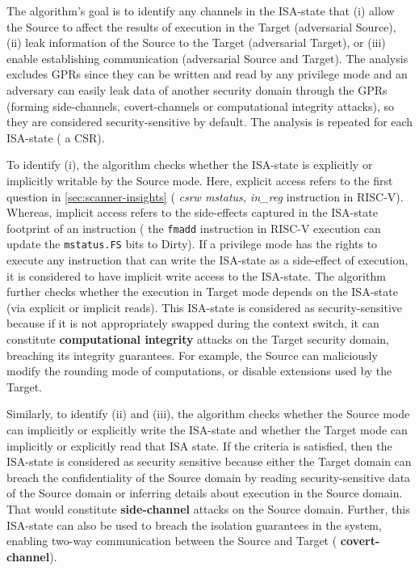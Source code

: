 The algorithm's goal is to identify any channels in the ISA-state that (i) allow the Source to affect the results of execution in the Target (adversarial Source), (ii) leak information of the Source to the Target (adversarial Target), or (iii) enable establishing communication (adversarial Source and Target). 
The analysis excludes GPRs since they can be written and read by any privilege mode and an adversary can easily leak data of another security domain through the GPRs (forming side-channels, covert-channels or computational integrity attacks), so they are considered security-sensitive by default. 
The analysis is repeated for each ISA-state (\eg{} a CSR). 

To identify (i), the algorithm checks whether the ISA-state is explicitly or implicitly writable by the Source mode. 
Here, explicit access refers to the first question in \autoref{sec:scanner-insights} (\eg{} \textit{csrw mstatus, in\_reg} instruction in RISC-V). 
Whereas, implicit access refers to the side-effects captured in the ISA-state footprint of an instruction (\eg{} the \texttt{fmadd} instruction in RISC-V execution can update the \texttt{mstatus.FS} bits to Dirty). 
If a privilege mode has the rights to execute any instruction that can write the ISA-state as a side-effect of execution, it is considered to have implicit write access to the ISA-state. 
The algorithm further checks whether the execution in Target mode depends on the ISA-state (via explicit or implicit reads). 
This ISA-state is considered as security-sensitive because if it is not appropriately swapped during the context switch, it can constitute \textbf{computational integrity} attacks on the Target security domain, breaching its integrity guarantees. 
For example, the Source can maliciously modify the rounding mode of computations, or disable extensions used by the Target.

Similarly, to identify (ii) and (iii), the algorithm checks whether the Source mode can implicitly or explicitly write the ISA-state and whether the Target mode can implicitly or explicitly read that ISA state. 
If the criteria is satisfied, then the ISA-state is considered as security sensitive because either the Target domain can breach the confidentiality of the Source domain by reading security-sensitive data of the Source domain or inferring details about execution in the Source domain. 
That would constitute \textbf{side-channel} attacks on the Source domain. 
Further, this ISA-state can also be used to breach the isolation guarantees in the system, enabling two-way communication between the Source and Target (\ie{} \textbf{covert-channel}). 

